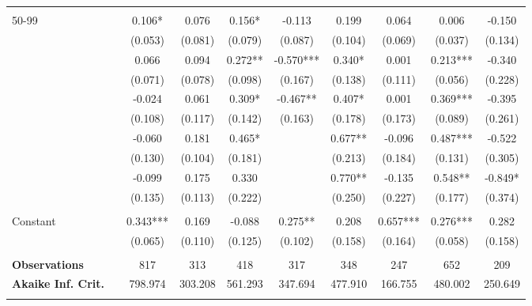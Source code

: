 \begin{tabular*}{\linewidth}{@{\extracolsep{\fill} } llcccccccc}
&&&&&&&&&\\%
\multirow{2}{*}{\hspace{0.2cm}50{-}99}&&0.106*&0.076&0.156*&{-}0.113&0.199&0.064&0.006&{-}0.150\\%
&&(0.053)&(0.081)&(0.079)&(0.087)&(0.104)&(0.069)&(0.037)&(0.134)\\%
\arrayrulecolor{white}%
\hline%
\arrayrulecolor{white}%
\hline%
\arrayrulecolor{white}%
\hline%
\arrayrulecolor{white}%
\hline%
\arrayrulecolor{white}%
\hline%
\multirow{2}{*}{\hspace{0.2cm}100{-}199}&&0.066&0.094&0.272**&{-}0.570***&0.340*&0.001&0.213***&{-}0.340\\%
&&(0.071)&(0.078)&(0.098)&(0.167)&(0.138)&(0.111)&(0.056)&(0.228)\\%
\arrayrulecolor{white}%
\hline%
\arrayrulecolor{white}%
\hline%
\arrayrulecolor{white}%
\hline%
\arrayrulecolor{white}%
\hline%
\arrayrulecolor{white}%
\hline%
\multirow{2}{*}{\hspace{0.2cm}200{-}299}&&{-}0.024&0.061&0.309*&{-}0.467**&0.407*&0.001&0.369***&{-}0.395\\%
&&(0.108)&(0.117)&(0.142)&(0.163)&(0.178)&(0.173)&(0.089)&(0.261)\\%
\arrayrulecolor{white}%
\hline%
\arrayrulecolor{white}%
\hline%
\arrayrulecolor{white}%
\hline%
\arrayrulecolor{white}%
\hline%
\arrayrulecolor{white}%
\hline%
\multirow{2}{*}{\hspace{0.2cm}300{-}399}&&{-}0.060&0.181&0.465*&&0.677**&{-}0.096&0.487***&{-}0.522\\%
&&(0.130)&(0.104)&(0.181)&&(0.213)&(0.184)&(0.131)&(0.305)\\%
\arrayrulecolor{white}%
\hline%
\arrayrulecolor{white}%
\hline%
\arrayrulecolor{white}%
\hline%
\arrayrulecolor{white}%
\hline%
\arrayrulecolor{white}%
\hline%
\multirow{2}{*}{\hspace{0.2cm}400+}&&{-}0.099&0.175&0.330&&0.770**&{-}0.135&0.548**&{-}0.849*\\%
&&(0.135)&(0.113)&(0.222)&&(0.250)&(0.227)&(0.177)&(0.374)\\%
\arrayrulecolor{white}%
\hline%
\arrayrulecolor{white}%
\hline%
\arrayrulecolor{white}%
\hline%
\arrayrulecolor{white}%
\hline%
\arrayrulecolor{white}%
\hline%
&&&&&&&&&\\%
\multirow{2}{*}{Constant}&&0.343***&0.169&{-}0.088&0.275**&0.208&0.657***&0.276***&0.282\\%
&&(0.065)&(0.110)&(0.125)&(0.102)&(0.158)&(0.164)&(0.058)&(0.158)\\%
\arrayrulecolor{white}%
\hline%
\arrayrulecolor{white}%
\hline%
\arrayrulecolor{white}%
\hline%
\arrayrulecolor{white}%
\hline%
\arrayrulecolor{white}%
\hline%
&&&&&&&&&\\%
\bfseries Observations&&817&313&418&317&348&247&652&209\\%
\bfseries Akaike Inf. Crit.&&798.974&303.208&561.293&347.694&477.910&166.755&480.002&250.649\\%
\arrayrulecolor{white}%
\hline%
\arrayrulecolor{white}%
\hline%
\arrayrulecolor{white}%
\hline%
\arrayrulecolor{white}%
\hline%
\arrayrulecolor{white}%
\hline%
\arrayrulecolor{black}%
\hline%
\end{tabular*}